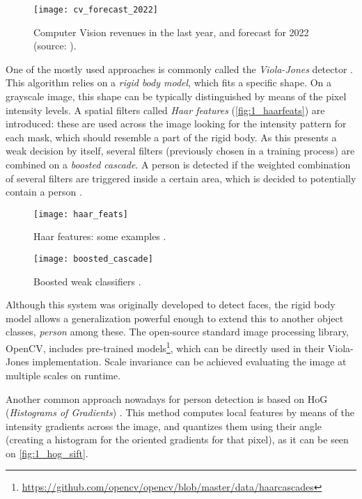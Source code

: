 \begin{figure}[h]
	\centering
	\texttt{[image: cv\_forecast\_2022]}
	\caption{Computer Vision revenues in the last year, and forecast for 2022 (source: \cite{cv_forecast}).}
	\label{fig:1_cv_forecast}
\end{figure}

One of the mostly used approaches is commonly called the \textit{Viola-Jones} detector \cite{violajones}. This algorithm relies on a \textit{rigid body model}, which fits a specific shape. On a grayscale image, this shape can be typically distinguished by means of the pixel intensity levels. A spatial filters called \textit{Haar features} (\autoref{fig:1_haarfeats}) are introduced: these are used across the image looking for the intensity pattern for each mask, which should resemble a part of the rigid body. As this presents a weak decision by itself, several filters (previously chosen in a training process) are combined on a \textit{boosted cascade}. A person is detected if the weighted combination of several filters are triggered inside a certain area, which is decided to potentially contain a person \cite{diapos_cv_clasif}.

\begin{figure}[h]
	\centering
	\texttt{[image: haar\_feats]}
	\caption{Haar features: some examples \cite{diapos_cv_clasif}.}
	\label{fig:1_haarfeats}
\end{figure}

\begin{figure}[h]
	\centering
	\texttt{[image: boosted\_cascade]}
	\caption{Boosted weak classifiers \cite{diapos_cv_clasif}.}
	\label{fig:1_violajones_boost}
\end{figure}

Although this system was originally developed to detect faces, the rigid body model allows a generalization powerful enough to extend this to another object classes, \textit{person} among these. The open-source standard image processing library, OpenCV, includes pre-trained models\footnote{\url{https://github.com/opencv/opencv/blob/master/data/haarcascades}}, which can be directly used in their Viola-Jones implementation. Scale invariance can be achieved evaluating the image at multiple scales on runtime.


Another common approach nowadays for person detection is based on HoG (\textit{Histograms of Gradients}) \cite{hog_detection}. This method computes local features by means of the intensity gradients across the image, and quantizes them using their angle (creating a histogram for the oriented gradients for that pixel), as it can be seen on \autoref{fig:1_hog_sift}.\\


